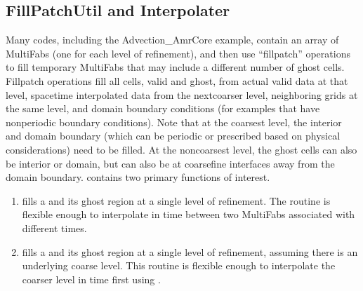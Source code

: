\documentclass[letterpaper,10pt,english]{sphinxmanual}
\begin{document}
\subsection{FillPatchUtil and Interpolater}
\label{\detokenize{AmrCore:fillpatchutil-and-interpolater}}\label{\detokenize{AmrCore:sec-amrcore-fillpatch}}
\sphinxAtStartPar
Many codes, including the Advection\_AmrCore example, contain an array of MultiFabs
(one for each level of refinement), and then use “fillpatch” operations to fill temporary
MultiFabs that may include a different number of ghost cells. Fillpatch operations fill
all cells, valid and ghost, from actual valid data at that level, space\sphinxhyphen{}time interpolated data
from the next\sphinxhyphen{}coarser level, neighboring grids at the same level, and domain
boundary conditions (for examples that have non\sphinxhyphen{}periodic boundary conditions).
Note that at the coarsest level,
the interior and domain boundary (which can be periodic or prescribed based on physical considerations)
need to be filled. At the non\sphinxhyphen{}coarsest level, the ghost cells can also be interior or domain,
but can also be at coarse\sphinxhyphen{}fine interfaces away from the domain boundary.
 contains two primary functions of interest.
\begin{enumerate}
%
\item {} 
\sphinxAtStartPar
{} fills a  and its ghost region at a single level of
refinement. The routine is flexible enough to interpolate in time between two MultiFabs
associated with different times.

\item {} 
\sphinxAtStartPar
{} fills a  and its ghost region at a single level of
refinement, assuming there is an underlying coarse level. This routine is flexible enough to interpolate
the coarser level in time first using .

\end{enumerate}
\end{document}
